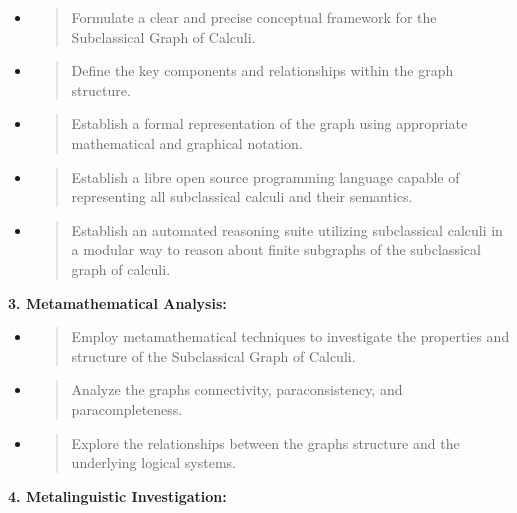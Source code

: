 \begin{itemize}
\item
  \begin{quote}
  Formulate a clear and precise conceptual framework for the
  Subclassical Graph of Calculi.
  \end{quote}
\item
  \begin{quote}
  Define the key components and relationships within the graph
  structure.
  \end{quote}
\item
  \begin{quote}
  Establish a formal representation of the graph using appropriate
  mathematical and graphical notation.
  \end{quote}
\item
  \begin{quote}
  Establish a libre open source programming language capable of
  representing all subclassical calculi and their semantics.
  \end{quote}
\item
  \begin{quote}
  Establish an automated reasoning suite utilizing subclassical calculi
  in a modular way to reason about finite subgraphs of the subclassical
  graph of calculi.
  \end{quote}
\end{itemize}

\textbf{3. Metamathematical Analysis:}

\begin{itemize}
\item
  \begin{quote}
  Employ metamathematical techniques to investigate the properties and
  structure of the Subclassical Graph of Calculi.
  \end{quote}
\item
  \begin{quote}
  Analyze the graph\textquotesingle s connectivity, paraconsistency, and
  paracompleteness.
  \end{quote}
\item
  \begin{quote}
  Explore the relationships between the graph\textquotesingle s
  structure and the underlying logical systems.
  \end{quote}
\end{itemize}

\textbf{4. Metalinguistic Investigation:}

